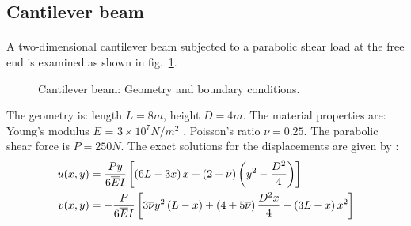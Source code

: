 \subsection{Cantilever beam}
\paragraph{}
A two-dimensional cantilever beam subjected to a parabolic shear load at the free end is examined as shown
in fig.~\ref{iso_fig:cantilever_beam_geo_bc}.
    \begin{figure}[h!]
    \centering
        \caption{ Cantilever beam: Geometry and boundary conditions.}
        \label{iso_fig:cantilever_beam_geo_bc}
    \end{figure}

The geometry is: length $L=8m$, height $D=4m$.
The material properties are: Young’s modulus $E$ = $3 \times 10^7 N/m^2$ , Poisson’s ratio $ \nu =0.25$.
The parabolic shear force is $P = 250 N$.
The exact solutions for the displacements are given by \cite{Aug2008}:
    \begin{equation}
        \begin{aligned}
            u(x,y) &= 
                \frac{Py}{6 \overline{E} I}
                \left[
                    \left(
                        6L-3x
                    \right)x
                    +\left(
                        2+ \overline{\nu}
                    \right)\left(
                        y^2-\frac{D^2}{4}
                    \right)
                \right]
            \\
            v(x,y) &=  
                -\frac{P}{6 \overline{E} I}
                \left[
                    3 \overline{\nu} y^2 \left(
                        L-x
                    \right)+
                    \left(
                        4+5 \overline{\nu}
                    \right)\frac{D^2x}{4}+
                    \left(
                        3L-x
                    \right)x^2
                \right]        
        \end{aligned}
    \label{iso_eq:cantilever_beam_displacement_solution}
    \end{equation}

